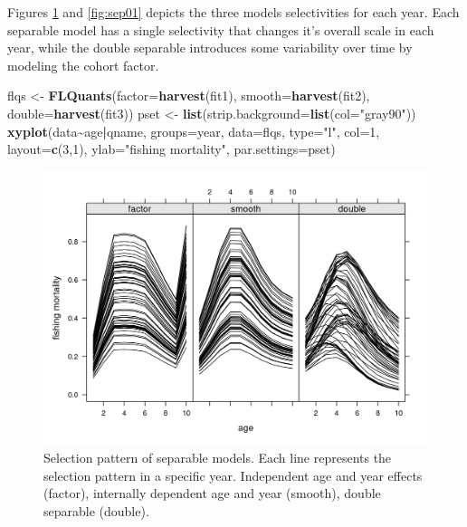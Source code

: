 \documentclass[
]{book}
\newenvironment{Shaded}{\begin{snugshade}}{\end{snugshade}}
\newcommand{\AttributeTok}[1]{\textcolor[rgb]{0.13,0.29,0.53}{#1}}
\newcommand{\DecValTok}[1]{\textcolor[rgb]{0.00,0.00,0.81}{#1}}
\newcommand{\FunctionTok}[1]{\textcolor[rgb]{0.13,0.29,0.53}{\textbf{#1}}}
\newcommand{\NormalTok}[1]{#1}
\newcommand{\OtherTok}[1]{\textcolor[rgb]{0.56,0.35,0.01}{#1}}
\newcommand{\SpecialCharTok}[1]{\textcolor[rgb]{0.81,0.36,0.00}{\textbf{#1}}}
\newcommand{\StringTok}[1]{\textcolor[rgb]{0.31,0.60,0.02}{#1}}
\begin{document}
Figures \ref{fig:sep00} and \ref{fig:sep01} depicts the three models selectivities for each year. Each separable model has a single selectivity that changes it's overall scale in each year, while the double separable introduces some variability over time by modeling the cohort factor.

\begin{Shaded}
\begin{Highlighting}[]
\NormalTok{flqs }\OtherTok{\textless{}{-}} \FunctionTok{FLQuants}\NormalTok{(}\AttributeTok{factor=}\FunctionTok{harvest}\NormalTok{(fit1), }\AttributeTok{smooth=}\FunctionTok{harvest}\NormalTok{(fit2), }\AttributeTok{double=}\FunctionTok{harvest}\NormalTok{(fit3))}
\NormalTok{pset }\OtherTok{\textless{}{-}} \FunctionTok{list}\NormalTok{(}\AttributeTok{strip.background=}\FunctionTok{list}\NormalTok{(}\AttributeTok{col=}\StringTok{"gray90"}\NormalTok{))}
\FunctionTok{xyplot}\NormalTok{(data}\SpecialCharTok{\textasciitilde{}}\NormalTok{age}\SpecialCharTok{|}\NormalTok{qname, }\AttributeTok{groups=}\NormalTok{year, }\AttributeTok{data=}\NormalTok{flqs, }\AttributeTok{type=}\StringTok{"l"}\NormalTok{, }\AttributeTok{col=}\DecValTok{1}\NormalTok{, }\AttributeTok{layout=}\FunctionTok{c}\NormalTok{(}\DecValTok{3}\NormalTok{,}\DecValTok{1}\NormalTok{), }\AttributeTok{ylab=}\StringTok{"fishing mortality"}\NormalTok{, }\AttributeTok{par.settings=}\NormalTok{pset)}
\end{Highlighting}
\end{Shaded}

\begin{figure}
\centering
\includegraphics{_bookdown_files/_main_files/figure-html/sep00-1.png}
\caption{\label{fig:sep00}Selection pattern of separable models. Each line represents the selection pattern in a specific year. Independent age and year effects (factor), internally dependent age and year (smooth), double separable (double).}
\end{figure}
\end{document}
